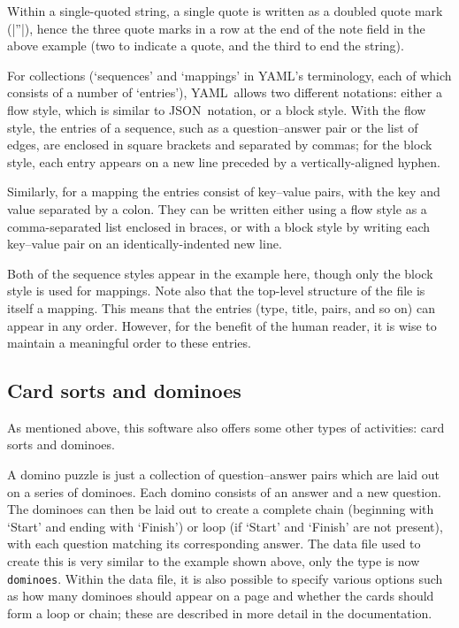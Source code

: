 \documentclass{article}
\def\YAML{{\small YAML}}
\def\JSON{{\small JSON}}
\begin{document}
Within a single-quoted string, a single quote is written as a doubled
quote mark (|''|), hence the three quote marks in a row at the
end of the note field in the above example (two to indicate a quote,
and the third to end the string).

For collections (`sequences' and `mappings' in \YAML's terminology,
each of which consists of a number of `entries'), \YAML\ allows two
different notations: either a flow style, which is similar to \JSON\
notation, or a block style.  With the flow style, the entries of a
sequence, such as a question--answer pair or the list of edges,
are enclosed in square brackets and separated by commas; for the block
style, each entry appears on a new line preceded by a
vertically-aligned hyphen.

Similarly, for a mapping the entries
consist of key--value pairs, with the key and value separated by a
colon.  They can be written either using a flow style as a
comma-separated list enclosed in braces, or with a block style by
writing each key--value pair on an identically-indented new line.

Both of the sequence styles appear in the example here, though only
the block style is used for mappings.  Note also that the top-level
structure of the file is itself a mapping.  This means that the
entries (type, title, pairs, and so on) can appear in any order.
However, for the benefit of the human reader, it is wise to maintain a
meaningful order to these entries.

\subsection{Card sorts and dominoes}

As mentioned above, this software also offers some other types of
activities: card sorts and dominoes.

A domino puzzle is just a collection of question--answer pairs
which are laid out on a series of dominoes.  Each domino consists of
an answer and a new question.  The dominoes can then be laid out to
create a complete chain (beginning with `Start' and ending with
`Finish') or loop (if `Start' and `Finish' are not present), with each
question matching its corresponding answer.  The data file used to
create this is very similar to the example shown above, only the type is
now \texttt{dominoes}.  Within the data file, it is also possible to specify
various options such as how many dominoes should appear on a page and
whether the cards should form a loop or chain; these are described in
more detail in the documentation.
\end{document}
